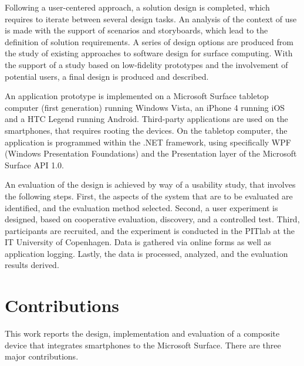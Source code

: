Following a user-centered approach, a solution design is completed, which requires to iterate between several design tasks.
An analysis of the context of use is made with the support of scenarios and storyboards, which lead to the definition of solution requirements.
A series of design options are produced from the study of existing approaches to software design for surface computing.
With the support of a study based on low-fidelity prototypes and the involvement of potential users, a final design is produced and described.

An application prototype is implemented on a Microsoft Surface tabletop computer (first generation) running Windows Vista, an iPhone 4 running iOS and a HTC Legend running Android.
Third-party applications are used on the smartphones, that requires rooting the devices.
On the tabletop computer, the application is programmed within the .NET framework,  using specifically WPF (Windows Presentation Foundations) and the Presentation layer of the Microsoft Surface API 1.0.

An evaluation of the design is achieved by way of a usability study, that involves the following steps.
First, the aspects of the system that are to be evaluated are identified, and the evaluation method selected.
Second, a user experiment is designed, based on cooperative evaluation, discovery, and a controlled test.
Third, participants are recruited, and the experiment is conducted in the PITlab at the IT University of Copenhagen.
Data is gathered via online forms as well as application logging.
Lastly, the data is processed, analyzed, and the evaluation results derived.

\section{Contributions}

This work reports the design, implementation and evaluation of a composite device that integrates smartphones to the Microsoft Surface.
There are three major contributions.

